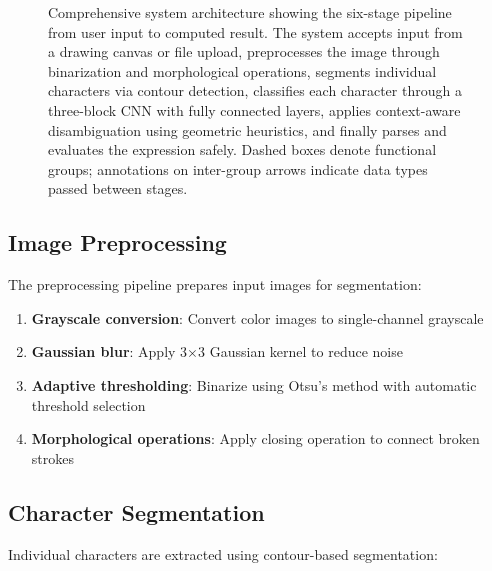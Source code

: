 \documentclass[conference]{IEEEtran}
\begin{document}
\begin{figure}[htbp]
\caption{Comprehensive system architecture showing the six-stage pipeline from user input to computed result. The system accepts input from a drawing canvas or file upload, preprocesses the image through binarization and morphological operations, segments individual characters via contour detection, classifies each character through a three-block CNN with fully connected layers, applies context-aware disambiguation using geometric heuristics, and finally parses and evaluates the expression safely. Dashed boxes denote functional groups; annotations on inter-group arrows indicate data types passed between stages.}
\label{fig:architecture}
\end{figure}

\subsection{Image Preprocessing}

The preprocessing pipeline prepares input images for segmentation:

\begin{enumerate}
    \item \textbf{Grayscale conversion}: Convert color images to single-channel grayscale
    \item \textbf{Gaussian blur}: Apply 3$\times$3 Gaussian kernel to reduce noise
    \item \textbf{Adaptive thresholding}: Binarize using Otsu's method with automatic threshold selection
    \item \textbf{Morphological operations}: Apply closing operation to connect broken strokes
\end{enumerate}

\subsection{Character Segmentation}

Individual characters are extracted using contour-based segmentation:
\end{document}
